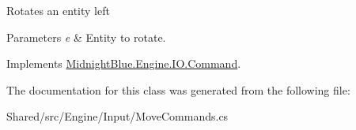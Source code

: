 Rotates an entity left 


\begin{DoxyParams}{Parameters}
{\em e} & Entity to rotate.\\
\hline
\end{DoxyParams}


Implements \hyperlink{class_midnight_blue_1_1_engine_1_1_i_o_1_1_command_ae641d2c1a9db17f03ee6b7854b00a9d2}{Midnight\+Blue.\+Engine.\+I\+O.\+Command}.



The documentation for this class was generated from the following file\+:\begin{DoxyCompactItemize}
\item 
Shared/src/\+Engine/\+Input/Move\+Commands.\+cs\end{DoxyCompactItemize}
